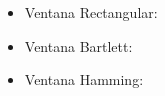 \documentclass[a4paper,12pt]{article}
\begin{document}
\begin{enumerate}
\begin{itemize}
\item Ventana Rectangular:\\
\item Ventana Bartlett: \\
\item Ventana Hamming: \\

\end{itemize}
\end{enumerate}
\end{document}
